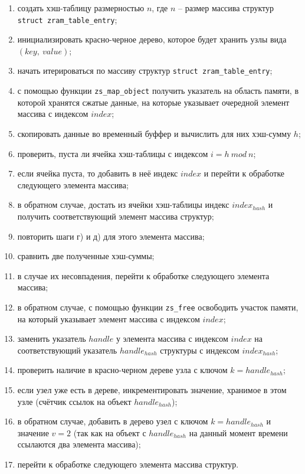 \documentclass[12pt, a4paper]{article}
\begin{document}
\begin{enumerate}
	\item создать хэш-таблицу размерностью $n$, где $n$ -- размер массива структур \texttt{struct zram\_table\_entry};
	\item инициализировать красно-черное дерево, которое будет хранить узлы вида $(key,\ value)$;
	\item начать итерироваться по массиву структур \texttt{struct zram\_table\_entry};
	\item с помощью функции \texttt{zs\_map\_object} получить указатель на область памяти, в которой хранятся сжатые данные, на которые указывает очередной элемент массива с индексом $index$;
	\item скопировать данные во временный буффер и вычислить для них хэш-сумму $h$;
	\item проверить, пуста ли ячейка хэш-таблицы с индексом $i = h \ mod \ n$;
	\item если ячейка пуста, то добавить в неё индекс $index$ и перейти к обработке следующего элемента массива;
	\item в обратном случае, достать из ячейки хэш-таблицы индекс $index_{hash}$ и получить соответствующий элемент массива структур;
	\item повторить шаги г) и д) для этого элемента массива;
	\item сравнить две полученные хэш-суммы;
	\item в случае их несовпадения, перейти к обработке следующего элемента массива;
	\item в обратном случае, с помощью функции \texttt{zs\_free} освободить участок памяти, на который указывает элемент массива с индексом $index$;
	\item заменить указатель $handle$ у элемента массива с индексом $index$ на соответствующий указатель $handle_{hash}$ структуры с индексом $index_{hash}$;
	\item проверить наличие в красно-черном дереве узла с ключом $k = handle_{hash}$;
	\item если узел уже есть в дереве, инкрементировать значение, хранимое в этом узле (счётчик ссылок на объект $handle_{hash}$);
	\item в обратном случае, добавить в дерево узел с ключом $k = handle_{hash}$ и значение $v = 2$ (так как на объект с $handle_{hash}$ на данный момент времени ссылаются два элемента массива);
	\item перейти к обработке следующего элемента массива структур.
\end{enumerate}
\end{document}
